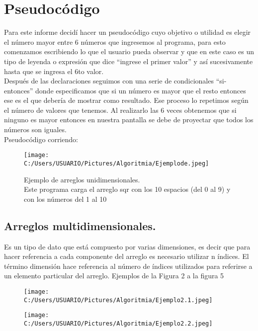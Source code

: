 \documentclass[journal]{IEEEtran}
\begin{document}
\section{Pseudocódigo}
Para este informe decidí hacer un pseudocódigo cuyo objetivo o utilidad es elegir el número mayor entre 6 números que ingresemos al programa, para esto comenzamos escribiendo lo que el usuario pueda observar y que en este caso es un tipo de leyenda o expresión que dice “ingrese el primer valor” y así sucesivamente hasta que se ingresa el 6to valor.\\
Después de las declaraciones seguimos con una serie de condicionales “si-entonces” donde especificamos que si un número es mayor que el resto entonces ese es el que debería de mostrar como resultado. Ese proceso lo repetimos según el número de valores que tenemos. Al realizarlo las 6 veces obtenemos que si ninguno es mayor entonces en nuestra pantalla se debe de proyectar que todos los números son iguales.\\

Pseudocódigo corriendo:



\begin{figure}[h!]
\centering
\texttt{[image: C:/Users/USUARIO/Pictures/Algoritmia/Ejemplode.jpeg]}
\caption{Ejemplo de arreglos unidimensionales.\\Este programa carga el arreglo sqr con los 10 espacios (del 0 al 9) y con los números del 1 al 10}
\label{figure_sim}
\end{figure}

\subsection{Arreglos multidimensionales.}
Es un tipo de dato que está compuesto por varias dimensiones, es decir que para hacer referencia a cada componente del arreglo es necesario utilizar n índices. El término dimensión hace referencia al número de índices utilizados para referirse a un elemento particular del arreglo.
Ejemplos de la Figura 2 a la figura 5

\begin{figure}[!]
\centering
\texttt{[image: C:/Users/USUARIO/Pictures/Algoritmia/Ejemplo2.1.jpeg]}
\caption{}
\label{figure_sim}
\end{figure}

\begin{figure}[!]
\centering
\texttt{[image: C:/Users/USUARIO/Pictures/Algoritmia/Ejemplo2.2.jpeg]}
\caption{}
\label{figure_sim}
\end{figure}
\end{document}
